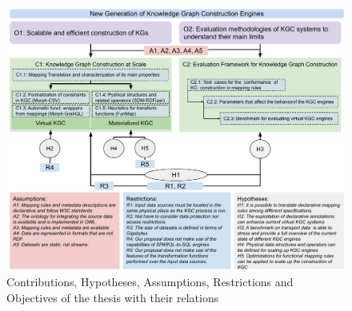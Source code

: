 \begin{figure}[!t]
\centering
\includegraphics[angle=90,width=1\textwidth]{figures/summarize contributions.pdf}
\caption[Relations of the contributions of the thesis]{Contributions, Hypotheses, Assumptions, Restrictions and Objectives of the thesis with their relations}
\label{fig:objectives_contributions}
\end{figure}